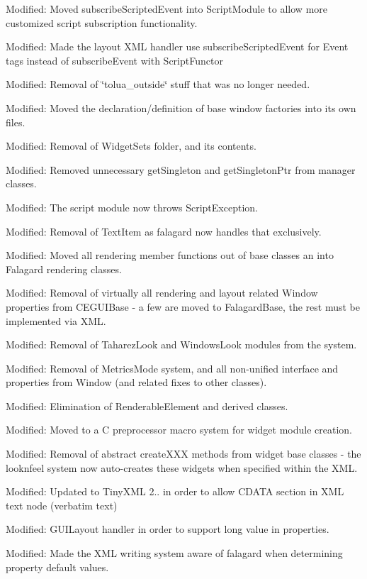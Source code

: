 \begin{DoxyItemize}
\item Modified\+: Moved subscribe\+Scripted\+Event into Script\+Module to allow more customized script subscription functionality.
\item Modified\+: Made the layout X\+ML handler use subscribe\+Scripted\+Event for Event tags instead of subscribe\+Event with Script\+Functor
\item Modified\+: Removal of \char`\"{}tolua\+\_\+outside\char`\"{} stuff that was no longer needed.
\item Modified\+: Moved the declaration/definition of base window factories into its own files.
\item Modified\+: Removal of Widget\+Sets folder, and it\textquotesingle{}s contents.
\item Modified\+: Removed unnecessary get\+Singleton and get\+Singleton\+Ptr from manager classes.
\item Modified\+: The script module now throws Script\+Exception.
\item Modified\+: Removal of Text\+Item as falagard now handles that exclusively.
\item Modified\+: Moved all rendering member functions out of base classes an into Falagard rendering classes.
\item Modified\+: Removal of virtually all rendering and layout related Window properties from C\+E\+G\+U\+I\+Base -\/ a few are moved to Falagard\+Base, the rest must be implemented via X\+ML.
\item Modified\+: Removal of Taharez\+Look and Windows\+Look modules from the system.
\item Modified\+: Removal of Metrics\+Mode system, and all non-\/unified interface and properties from Window (and related fixes to other classes).
\item Modified\+: Elimination of Renderable\+Element and derived classes.
\item Modified\+: Moved to a C preprocessor macro system for widget module creation.
\item Modified\+: Removal of abstract create\+X\+XX methods from widget base classes -\/ the looknfeel system now auto-\/creates these widgets when specified within the X\+ML.
\item Modified\+: Updated to Tiny\+X\+ML 2.. in order to allow C\+D\+A\+TA section in X\+ML text node (verbatim text)
\item Modified\+: G\+U\+I\+Layout handler in order to support long value in properties.
\item Modified\+: Made the X\+ML writing system aware of falagard when determining property default values.

\end{DoxyItemize}
